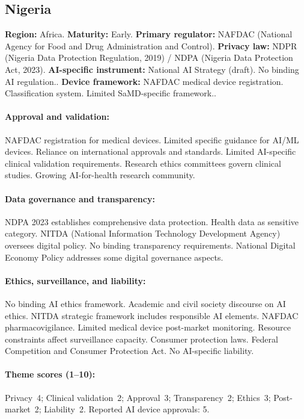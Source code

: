 {\subsection{Nigeria}
\textbf{Region:} Africa.
\textbf{Maturity:} Early.
\textbf{Primary regulator:} NAFDAC (National Agency for Food and Drug Administration and Control).
\textbf{Privacy law:} NDPR (Nigeria Data Protection Regulation, 2019) / NDPA (Nigeria Data Protection Act, 2023).
\textbf{AI-specific instrument:} National AI Strategy (draft). No binding AI regulation..
\textbf{Device framework:} NAFDAC medical device registration. Classification system. Limited SaMD-specific framework..

\paragraph{Approval and validation:}
NAFDAC registration for medical devices. Limited specific guidance for AI/ML devices. Reliance on international approvals and standards.
Limited AI-specific clinical validation requirements. Research ethics committees govern clinical studies. Growing AI-for-health research community.

\paragraph{Data governance and transparency:}
NDPA 2023 establishes comprehensive data protection. Health data as sensitive category. NITDA (National Information Technology Development Agency) oversees digital policy.
No binding transparency requirements. National Digital Economy Policy addresses some digital governance aspects.

\paragraph{Ethics, surveillance, and liability:}
No binding AI ethics framework. Academic and civil society discourse on AI ethics. NITDA strategic framework includes responsible AI elements.
NAFDAC pharmacovigilance. Limited medical device post-market monitoring. Resource constraints affect surveillance capacity.
Consumer protection laws. Federal Competition and Consumer Protection Act. No AI-specific liability.

\paragraph{Theme scores (1--10):}
Privacy~4;
Clinical validation~2;
Approval~3;
Transparency~2;
Ethics~3;
Post-market~2;
Liability~2.
Reported AI device approvals: 5.

}
